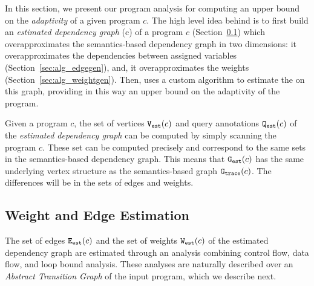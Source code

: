 In this section, we present our program analysis {\THESYSTEM} for
computing an upper bound on the \emph{adaptivity} of a given program
$c$.  The high level idea behind {\THESYSTEM} is to first build
an \emph{estimated dependency graph} \progG(c) of a program $c$
(Section~\ref{sec:alg_weightedgegen}) which overapproximates the
semantics-based dependency graph in two dimensions: it
overapproximates the dependencies between assigned variables (Section~\ref{sec:alg_edgegen}), and, it
overapproximates the weights (Section~\ref{sec:alg_weightgen}). Then, {\THESYSTEM} uses a custom algorithm to estimate the 
 on this graph, providing in this way an upper bound on the adaptivity of the
program.


%
%
Given a program $c$, the set of vertices $\mathtt{{V_{est}}}(c)$ and query annotations $\mathtt{{Q_{est}}}(c)$ of the \emph{estimated dependency graph} can be computed by simply
scanning the program $c$. These set can be computed precisely and correspond to
the same sets in the semantics-based dependency graph.
This means that $\mathtt{{G_{est}}}(c)$ has the same underlying vertex structure as 
the semantics-based graph $\mathtt{{G_{trace}}}(c)$. The differences will be in the sets of edges and weights. 



\subsection{Weight and Edge Estimation}
\label{sec:alg_weightedgegen}
The set of edges $\mathtt{{E_{est}}}(c)$ and the set of weights $\mathtt{{W_{est}}}(c)$ of the estimated dependency graph are estimated through an analysis combining control flow, data flow, and loop bound analysis. These analyses are naturally described over an  \emph{Abstract Transition Graph} of the input program, which we describe next.
%
%
